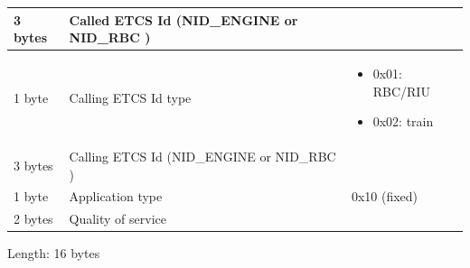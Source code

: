 \documentclass[nocc]{template/openetcs_report}
\begin{document}
\begin{longtable}{|l|l|l|}
				\hline
					 \begin{minipage}[t]{0.1\linewidth}3 bytes \end{minipage}
					&\begin{minipage}[t]{0.6\linewidth}Called ETCS Id (NID\_ENGINE or NID\_RBC )\end{minipage}
					&\begin{minipage}[t]{0.3\linewidth}\end{minipage} \\
					
				\hline
					 \begin{minipage}[t]{0.1\linewidth}1 byte \end{minipage}
					&\begin{minipage}[t]{0.6\linewidth}Calling ETCS Id type	\end{minipage}
					&\begin{minipage}[t]{0.3\linewidth}
						\begin{itemize}
							\item 0x01: RBC/RIU
							\item 0x02: train
						\end{itemize}
					\end{minipage} \\
					
				\hline
					 \begin{minipage}[t]{0.1\linewidth}3 bytes \end{minipage}
					&\begin{minipage}[t]{0.6\linewidth}Calling ETCS Id (NID\_ENGINE or NID\_RBC )	\end{minipage}
					&\begin{minipage}[t]{0.3\linewidth}\end{minipage} \\
					
				\hline
					 \begin{minipage}[t]{0.1\linewidth}1 byte \end{minipage}
					&\begin{minipage}[t]{0.6\linewidth}Application type \end{minipage}
					&\begin{minipage}[t]{0.3\linewidth}0x10 (fixed) \end{minipage} \\
					
				\hline
					 \begin{minipage}[t]{0.1\linewidth}2 bytes \end{minipage}
					&\begin{minipage}[t]{0.6\linewidth}Quality of service\end{minipage}
					&\begin{minipage}[t]{0.3\linewidth}\end{minipage} \\
				
				\hline
			\end{longtable}
			Length: 16 bytes
\end{document}
